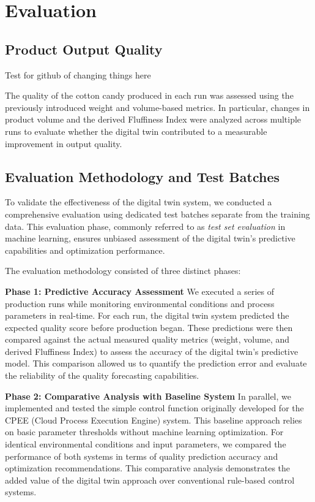 \chapter{Evaluation}
\label{sec:evaluation}

\section{Product Output Quality}

Test for github of changing things here


The quality of the cotton candy produced in each run was assessed using the previously introduced weight and volume-based metrics. In particular, changes in product volume and the derived Fluffiness Index were analyzed across multiple runs to evaluate whether the digital twin contributed to a measurable improvement in output quality.

\section{Evaluation Methodology and Test Batches}

To validate the effectiveness of the digital twin system, we conducted a comprehensive evaluation using dedicated test batches separate from the training data. This evaluation phase, commonly referred to as \textit{test set evaluation} in machine learning, ensures unbiased assessment of the digital twin's predictive capabilities and optimization performance.

The evaluation methodology consisted of three distinct phases:

\textbf{Phase 1: Predictive Accuracy Assessment}
We executed a series of production runs while monitoring environmental conditions and process parameters in real-time. For each run, the digital twin system predicted the expected quality score before production began. These predictions were then compared against the actual measured quality metrics (weight, volume, and derived Fluffiness Index) to assess the accuracy of the digital twin's predictive model. This comparison allowed us to quantify the prediction error and evaluate the reliability of the quality forecasting capabilities.

\textbf{Phase 2: Comparative Analysis with Baseline System}
In parallel, we implemented and tested the simple control function originally developed for the CPEE (Cloud Process Execution Engine) system. This baseline approach relies on basic parameter thresholds without machine learning optimization. For identical environmental conditions and input parameters, we compared the performance of both systems in terms of quality prediction accuracy and optimization recommendations. This comparative analysis demonstrates the added value of the digital twin approach over conventional rule-based control systems.


